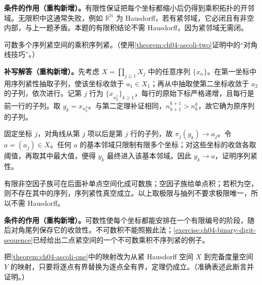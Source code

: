 \documentclass[../../main.tex]{subfiles}%
\begin{document}
\begin{remark}
\textbf{条件的作用（重构新增）。}有限性保证把每个坐标都缩小后仍得到乘积拓扑的开邻域。无限积中这通常失败，例如 $\mathbb R^{\mathbb N}$ 为 Hausdorff，若有紧邻域，它必闭且有非空内部，与上一题矛盾。本题的有限积结论不需 Hausdorff，因为紧邻域无需闭。
\end{remark}
\begin{exercise}\label{exercise:ch04-countable-sequential-product}
可数多个序列紧空间的乘积序列紧。（使用\cref{theorem:ch04-ascoli-two}证明中的“对角线技巧”。）
\end{exercise}
\begin{solution}
\textbf{补写解答（重构新增）。}先考虑 $X=\prod_{j\ge1}X_j$ 中的任意序列 $\{x_n\}$。在第一坐标中用序列紧性抽取子列，使该坐标收敛于 $a_1\in X_1$；再从中抽取使第二坐标收敛于 $a_2$ 的子列，依次进行。记第 $j$ 行为 $\{x_{n_k^j}\}_{k\ge1}$，每行的原始下标严格递增，且每行是前一行的子列。取 $y_k=x_{n_k^k}$。与第二定理补证相同，$n_{k+1}^{k+1}>n_k^k$，故它确为原序列的子列。

固定坐标 $j$，对角线从第 $j$ 项以后是第 $j$ 行的子列，故 $\pi_j(y_k)\to a_j$。令 $a=(a_j)\in X$。任何 $a$ 的基本邻域只限制有限多个坐标；对这些坐标的收敛各取阈值，再取其中最大值，便得 $y_k$ 最终进入该基本邻域。因此 $y_k\to a$，证明序列紧性。

有限非空因子族可在后面补单点空间化成可数族；空因子族给单点积；若积为空，则不存在其中的序列，序列紧性真空成立。以上取极限与抽列不要求极限唯一，所以不需 Hausdorff。
\end{solution}
\begin{remark}
\textbf{条件的作用（重构新增）。}可数性使每个坐标都能安排在一个有限编号的阶段，随后对角尾列保存它的收敛性。不可数积不能照搬此法；\cref{exercise:ch04-binary-digit-sequence}已经给出二点紧空间的一个不可数乘积不序列紧的例子。
\end{remark}
\begin{exercise}\label{exercise:ch04-ascoli-metric-target}
把\cref{theorem:ch04-ascoli-one}中的映射改为从紧 Hausdorff 空间 $X$ 到完备度量空间 $Y$ 的映射，只要将逐点有界替换为逐点全有界，定理仍成立。（准确表述此断言并证明。）
\end{exercise}
\end{document}
